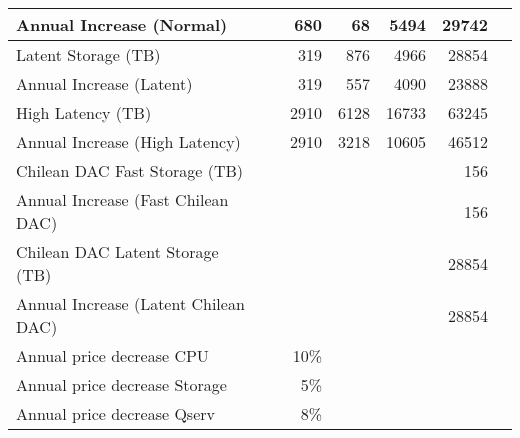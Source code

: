 \begin{longtable} { |p{}  |r  |r  |r  |r  |r  |r |}
{Annual Increase (Normal)}&{}&{680}&{68}&{5494}&{29742} \\ \hline
{Latent Storage  (TB)}&{}&{319}&{876}&{4966}&{28854} \\ \hline
{Annual Increase (Latent)}&{}&{319}&{557}&{4090}&{23888} \\ \hline
{High Latency (TB)}&{}&{2910}&{6128}&{16733}&{63245} \\ \hline
{Annual Increase (High Latency)}&{}&{2910}&{3218}&{10605}&{46512} \\ \hline
{Chilean DAC Fast Storage (TB)}&{}&{}&{}&{}&{156} \\ \hline
{Annual Increase (Fast Chilean DAC)}&{}&{}&{}&{}&{156} \\ \hline
{Chilean DAC Latent Storage (TB)}&{}&{}&{}&{}&{28854} \\ \hline
{Annual Increase (Latent Chilean DAC)}&{}&{}&{}&{}&{28854} \\ \hline
{Annual price decrease CPU}&{}&{10\%}&{}&{}&{} \\ \hline
{Annual price decrease Storage}&{}&{5\%}&{}&{}&{} \\ \hline
{Annual price decrease Qserv}&{}&{8\%}&{}&{}&{} \\ \hline
\end{longtable} \normalsize
